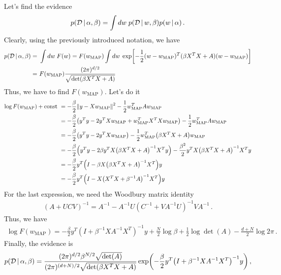 Let's find the evidence
\begin{align}
    p(\mathcal{D}\,|\, \alpha,\beta) = \int dw\; p(\mathcal{D}\,|\, w,\beta)p(w\,|\, \alpha)\,.
\end{align}
Clearly, using the previously introduced notation, we have
\begin{align}
    p(\mathcal{D}\cond \alpha,\beta) =~& \int dw\; F(w) = F(w_{\text{MAP}})\int dw\; \exp\left[-\frac{1}{2} (w - w_{\text{MAP}})^T (\beta X^TX + A) (w - w_{\text{MAP}})\right]\\
    =~& F(w_{\text{MAP}}) \frac{(2\pi)^{d/2}}{\sqrt{\det(\beta X^TX + A)}}
\end{align}
Thus, we have to find $F(w_{\text{MAP}})$.
Let's do it
\begin{align}
    \log F(w_{\text{MAP}}) + \text{const} ~&= -\frac{\beta}{2}\norm{y-Xw_{\text{MAP}}}^2 - \frac{1}{2}w_{\text{MAP}}^TAw_{\text{MAP}}\\
    ~&= -\frac{\beta}{2}\left(y^Ty-2y^TXw_{\text{MAP}} + w_{\text{MAP}}^TX^TXw_{\text{MAP}} \right) - \frac{1}{2}w_{\text{MAP}}^TAw_{\text{MAP}}\\
    ~&= -\frac{\beta}{2}\left(y^Ty-2y^TXw_{\text{MAP}}\right) -\frac{1}{2} w_{\text{MAP}}^T\left(\beta X^TX + A\right)w_{\text{MAP}}\\
    ~&= -\frac{\beta}{2}\left(y^Ty-2\beta y^TX\left(\beta X^TX + A\right)^{-1} X^Ty\right) -\frac{\beta^2}{2} y^TX\left(\beta X^TX + A\right)^{-1} X^Ty\\
    ~&= -\frac{\beta}{2}y^T\left(I-\beta X\left(\beta X^TX + A\right)^{-1} X^T\right)y\\
    ~&= -\frac{\beta}{2}y^T\left(I- X\left(X^TX + \beta^{-1}A\right)^{-1} X^T\right)y
\end{align}
For the last expression, we need the Woodbury matrix identity
\begin{align}
    \left(A + UCV\right)^{-1} = A^{-1} - A^{-1}U\left(C^{-1} + VA^{-1}U\right)^{-1}VA^{-1}\,.
\end{align}
Thus, we have
\begin{align}
    \log F(w_{\text{MAP}}) = -\frac{\beta}{2}y^T\left(I + \beta^{-1}XA^{-1}X^T\right)^{-1}y + \frac{N}{2}\log \beta + \frac{1}{2}\log \det(A) - \frac{d+N}{2}\log 2\pi\,.
\end{align}
Finally, the evidence is
\begin{align}
    p(\mathcal{D}\cond \alpha,\beta) = \frac{(2\pi)^{d/2}\beta^{N/2}\sqrt{\det(A)}}{(2\pi)^{(d+N)/2}\sqrt{\det\left(\beta X^TX + A\right)}}\exp\left(-\frac{\beta}{2}y^T\left(I + \beta^{-1}XA^{-1}X^T\right)^{-1}y\right)\,,
\end{align}
